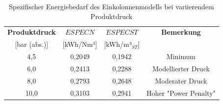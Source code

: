 \begin{table}[htbp]
\centering
\caption{Spezifischer Energiebedarf des Einkolonnenmodells bei variierendem Produktdruck}
\label{tab:spez_energie_single}
\begin{tabular}{cccc}
\hline
\textbf{Produktdruck} & \textbf{$ESPECN$} & \textbf{$ESPECST$} & \textbf{Bemerkung} \\
{[bar (abs.)]} & {[kWh/Nm³]} & {[kWh/m³$_{ST}$]} & \\ \hline
4,5 & 0,2049 & 0,1942 & Minimum \\
6,0 & 0,2413 & 0,2288 & Modellierter Druck \\
8,0 & 0,2793 & 0,2648 & Moderater Druck \\
10,0 & 0,3103 & 0,2941 & Hoher "Power Penalty" \\ \hline
\end{tabular}
\end{table}